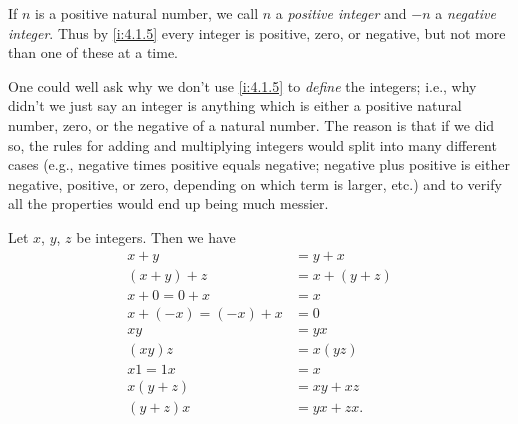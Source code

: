 \begin{note}
  If \(n\) is a positive natural number, we call \(n\) a \emph{positive integer} and \(-n\) a \emph{negative integer}.
  Thus by \cref{i:4.1.5} every integer is positive, zero, or negative, but not more than one of these at a time.
\end{note}

\begin{note}
  One could well ask why we don't use \cref{i:4.1.5} to \emph{define} the integers;
  i.e., why didn't we just say an integer is anything which is either a positive natural number, zero, or the negative of a natural number.
  The reason is that if we did so, the rules for adding and multiplying integers would split into many different cases (e.g., negative times positive equals negative; negative plus positive is either negative, positive, or zero, depending on which term is larger, etc.) and to verify all the properties would end up being much messier.
\end{note}

\begin{prop}\label{i:4.1.6}
  Let \(x\), \(y\), \(z\) be integers.
  Then we have
  \begin{align*}
    x + y               & = y + x       \\
    (x + y) + z         & = x + (y + z) \\
    x + 0 = 0 + x       & = x           \\
    x + (-x) = (-x) + x & = 0           \\
    xy                  & = yx          \\
    (xy)z               & = x(yz)       \\
    x1 = 1x             & = x           \\
    x(y + z)            & = xy + xz     \\
    (y + z)x            & = yx + zx.
  \end{align*}
\end{prop}

